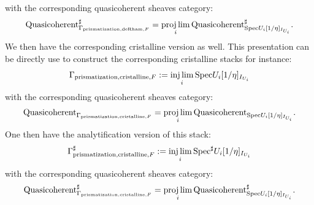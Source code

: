 \documentclass[12pt]{article}
\theoremstyle{definition}
\begin{document}
with the corresponding quasicoherent sheaves category:
\begin{align}
\mathrm{Quasicoherent}^\sharp_{\mathrm{\Gamma}_{\mathrm{prismatization},\mathrm{deRham},F}}=\projlim_i \mathrm{Quasicoherent}^\sharp_{\mathrm{Spec}U_i[1/\eta]_{I_{U_i}}}.
\end{align}
We then have the corresponding cristalline version as well. This presentation can be directly use to construct the corresponding cristalline stacks for instance:
\begin{align}
\mathrm{\Gamma}_{\mathrm{prismatization},\mathrm{cristalline},F}:=\injlim_i \mathrm{Spec}U_i[1/\eta]_{I_{U_i}}
\end{align}
with the corresponding quasicoherent sheaves category:
\begin{align}
\mathrm{Quasicoherent}_{\mathrm{\Gamma}_{\mathrm{prismatization},\mathrm{cristalline},F}}=\projlim_i \mathrm{Quasicoherent}_{\mathrm{Spec}U_i[1/\eta]_{I_{U_i}}}.
\end{align}
One then have the analytification version of this stack:
\begin{align}
\mathrm{\Gamma}^\sharp_{\mathrm{prismatization},\mathrm{cristalline},F}:=\injlim_i \mathrm{Spec}^\sharp U_i[1/\eta]_{I_{U_i}}
\end{align}
with the corresponding quasicoherent sheaves category:
\begin{align}
\mathrm{Quasicoherent}^\sharp_{\mathrm{\Gamma}_{\mathrm{prismatization},\mathrm{cristalline},F}}=\projlim_i \mathrm{Quasicoherent}^\sharp_{\mathrm{Spec}U_i[1/\eta]_{I_{U_i}}}.
\end{align} 
\end{document}
